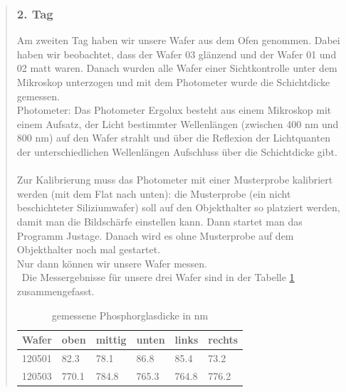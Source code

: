 \begin{quote}
    		\vspace{2em}



		\subsubsection{2. Tag}


			Am zweiten Tag haben wir unsere Wafer aus dem Ofen genommen. Dabei
			haben wir beobachtet, dass der Wafer 03 glänzend und der Wafer 01
			und 02 matt waren. Danach wurden alle Wafer einer Sichtkontrolle
			unter dem Mikroskop unterzogen und mit dem Photometer wurde die
			Schichtdicke gemessen.\\

			Photometer: Das Photometer Ergolux besteht aus einem Mikroskop mit
			einem Aufsatz, der Licht bestimmter Wellenlängen (zwischen 400 nm
			und 800 nm) auf den Wafer strahlt und über die Reflexion der
			Lichtquanten der unterschiedlichen Wellenlängen Aufschluss über
			die Schichtdicke gibt.\\
			\\
			Zur Kalibrierung muss das Photometer mit einer Musterprobe kalibriert
			werden (mit dem Flat nach unten): die Musterprobe (ein nicht
			beschichteter Siliziumwafer) soll auf den Objekthalter so platziert
			werden, damit man die Bildschärfe einstellen kann. Dann startet man
			das Programm Justage. Danach wird es ohne Musterprobe auf dem
			Objekthalter noch mal gestartet.\\
			Nur dann können wir unsere Wafer messen.\\
			\
			Die Messergebnisse für unsere drei Wafer sind in der Tabelle
			\ref{tab:Phosphordicke} zusammengefasst.

			\vspace{2em}

      		\begin{table}[H]
     		  \begin{addmargin}[1cm]{3cm}
     			\centering
                    \begin{tabular}{|p{2cm}|p{2cm}|p{2cm}|p{2cm}|p{2cm}|p{2cm}|}
         			\hline
         			Wafer & oben & mittig & unten & links & rechts\\
         			\hline
        			120501 & 82.3  & 78.1  & 86.8  & 85.4  & 73.2 \\
                    120503 & 770.1 & 784.8 & 765.3 & 764.8 & 776.2 \\
                    \hline

                    \end{tabular}
              \end{addmargin}
              \caption{gemessene Phosphorglasdicke in nm}
              \label{tab:Phosphordicke}
            \end{table}


\end{quote}
